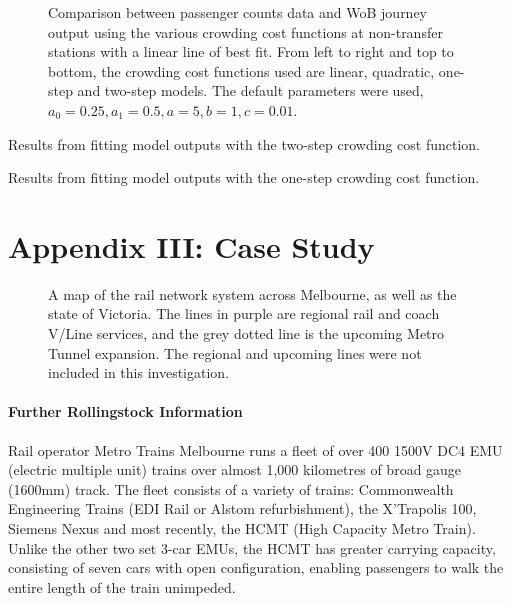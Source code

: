 \begin{figure}[h]
\begin{subfigure}{0.45\linewidth}
        \label{fig:val_two}
    \end{subfigure}
    \caption[Full plots of the comparison between passenger counts data and WoB journey output using various crowding cost functions]{Comparison between passenger counts data and WoB journey output using the various crowding cost functions at non-transfer stations with a linear line of best fit. From left to right and top to bottom, the crowding cost functions used are linear, quadratic, one-step and two-step models. The default parameters were used, $a_0=0.25, a_1=0.5, a=5, b=1, c=0.01$.}
    \label{fig:validation_grid}
\end{figure}



\begin{table}[t]
\centering
\caption{Results from fitting model outputs with the two-step crowding cost function.}
\end{table}

\begin{table}[t]
\centering
\caption{Results from fitting model outputs with the one-step crowding cost function.}
\end{table}


\chapter{Appendix III: Case Study}
\label{chap:case_study_app}

\begin{figure}[ht]
    \centering
    
    \caption[Map of Melbourne's rail network]{A map of the rail network system across Melbourne, as well as the state of Victoria. The lines in purple are regional rail and coach V/Line services, and the grey dotted line is the upcoming Metro Tunnel expansion. The regional and upcoming lines were not included in this investigation.}
    \label{fig:melb-network-map}
\end{figure}

\subsubsection{Further Rollingstock Information}
Rail operator Metro Trains Melbourne runs a fleet of over 400 1500V DC4 EMU (electric multiple unit) trains over almost 1,000 kilometres of broad gauge (1600mm) track. The fleet consists of a variety of trains: Commonwealth Engineering Trains (EDI Rail or Alstom refurbishment), the X’Trapolis 100, Siemens Nexus and most recently, the HCMT (High Capacity Metro Train). Unlike the other two set 3-car EMUs, the HCMT has greater carrying capacity, consisting of seven cars with open configuration, enabling passengers to walk the entire length of the train unimpeded. 

